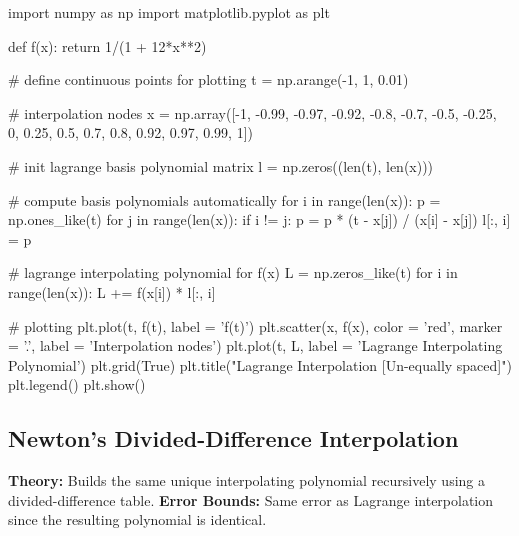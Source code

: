 \documentclass{article}
\begin{document}
\begin{jupytercode}
import numpy as np
import matplotlib.pyplot as plt

def f(x):
    return 1/(1 + 12*x**2)

# define continuous points for plotting
t = np.arange(-1, 1, 0.01)

# interpolation nodes
x = np.array([-1, -0.99, -0.97, -0.92, -0.8, -0.7, -0.5, -0.25, 0, 0.25, 0.5, 0.7, 0.8, 0.92, 0.97, 0.99, 1])

# init lagrange basis polynomial matrix
l = np.zeros((len(t), len(x)))

# compute basis polynomials automatically
for i in range(len(x)):
    p = np.ones_like(t)
    for j in range(len(x)):
        if i != j:
            p = p * (t - x[j]) / (x[i] - x[j])
    l[:, i] = p

# lagrange interpolating polynomial for f(x)
L = np.zeros_like(t)
for i in range(len(x)):
    L += f(x[i]) * l[:, i]

# plotting
plt.plot(t, f(t), label = 'f(t)')
plt.scatter(x, f(x), color = 'red', marker = '.', label = 'Interpolation nodes')
plt.plot(t, L, label = 'Lagrange Interpolating Polynomial')
plt.grid(True)
plt.title("Lagrange Interpolation [Un-equally spaced]")
plt.legend()
plt.show()
\end{jupytercode}
\newpage

\subsection{Newton's Divided-Difference Interpolation}
\textbf{Theory:} Builds the same unique interpolating polynomial recursively using a divided-difference table.
\textbf{Error Bounds:} Same error as Lagrange interpolation since the resulting polynomial is identical. 
\end{document}
